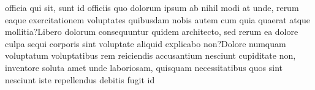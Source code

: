 \documentclass[letterpaper]{article} %
\begin{document}
officia qui sit, sunt id officiis quo dolorum ipsum ab nihil modi at unde, rerum eaque exercitationem voluptates quibusdam nobis autem cum quia quaerat atque mollitia?Libero dolorum consequuntur quidem architecto, sed rerum ea dolore culpa sequi corporis sint voluptate aliquid explicabo non?Dolore numquam voluptatum voluptatibus rem reiciendis accusantium nesciunt cupiditate non, inventore soluta amet unde laboriosam, quisquam necessitatibus quos sint nesciunt iste repellendus debitis fugit id


\end{document}
